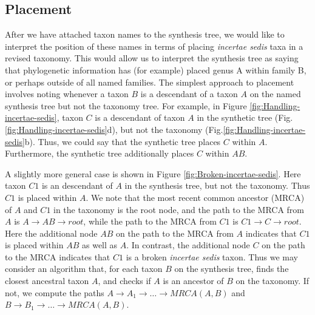 \documentclass[english]{article}
\begin{document}
\subsection{Placement}\label{subsec:Placement}

After we have attached taxon names to the synthesis tree, we would
like to interpret the position of these names in terms of placing
\emph{incertae sedis }taxa in a revised taxonomy.
This would allow us
to interpret the synthesis tree as saying that phylogenetic
information has (for example) placed genus A within family B, or
perhaps outside of all named families.
The simplest approach to
placement involves noting whenever a taxon $B$ is a descendant of a
taxon $A$ on the named synthesis tree but not the taxonomy tree.
For
example, in Figure \ref{fig:Handling-incertae-sedis}, taxon $C$ is a
descendant of taxon $A$ in the synthetic tree 
(Fig.\ref{fig:Handling-incertae-sedis}d), but not the taxonomy 
(Fig.\ref{fig:Handling-incertae-sedis}b).
Thus, we could say that the synthetic tree places
$C$ within $A$. Furthermore, the synthetic tree additionally places
$C$ within $AB$.

A slightly more general case is shown in 
Figure \ref{fig:Broken-incertae-sedis}.
Here taxon $C1$ is an descendant of $A$ in the
synthesis tree, but not the taxonomy.
Thus $C1$ is placed within $A$.
We note that the most recent common ancestor (MRCA) of $A$ and $C1$ in
the taxonomy is the root node, and the path to the MRCA from $A$ is
$A\to AB\to root$, while the path to the MRCA from $C1$ is $C1\to C\to
root$.
Here the additional node $AB$ on the path to the MRCA from $A$
indicates that $C1$ is placed within $AB$ as well as $A$.
In contrast,
the additional node $C$ on the path to the MRCA indicates that $C1$ is
a broken \emph{incertae sedis} taxon.
Thus we may consider an
algorithm that, for each taxon $B$ on the synthesis tree, finds the
closest ancestral taxon $A$, and checks if $A$ is an ancestor of $B$
on the taxonomy.
If not, we compute the paths $A\to A_{1}\to\ldots\to
MRCA(A,B)$ and $B\to B_{1}\to\ldots\to MRCA(A,B)$.
\end{document}
